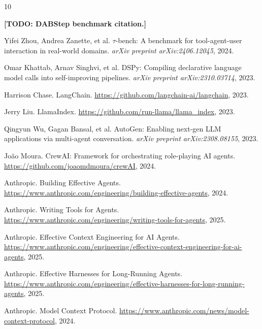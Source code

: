 \documentclass[11pt, logo, onecolumn, copyright, colorlinks=true, allcolors=blue]{nvidiatechreport}
\newcommand{\placeholder}[1]{\textcolor{red!60!black}{\textbf{[TODO: #1]}}}
\begin{document}
\begin{thebibliography}{10}

\placeholder{DABStep benchmark citation.}

Yifei Zhou, Andrea Zanette, et al.
\newblock $\tau$-bench: A benchmark for tool-agent-user interaction in real-world domains.
\newblock \emph{arXiv preprint arXiv:2406.12045}, 2024.

Omar Khattab, Arnav Singhvi, et al.
\newblock DSPy: Compiling declarative language model calls into self-improving pipelines.
\newblock \emph{arXiv preprint arXiv:2310.03714}, 2023.

Harrison Chase.
\newblock LangChain.
\newblock \url{https://github.com/langchain-ai/langchain}, 2023.

Jerry Liu.
\newblock LlamaIndex.
\newblock \url{https://github.com/run-llama/llama_index}, 2023.

Qingyun Wu, Gagan Bansal, et al.
\newblock AutoGen: Enabling next-gen LLM applications via multi-agent conversation.
\newblock \emph{arXiv preprint arXiv:2308.08155}, 2023.

Jo\~{a}o Moura.
\newblock CrewAI: Framework for orchestrating role-playing AI agents.
\newblock \url{https://github.com/joaomdmoura/crewAI}, 2024.

Anthropic.
\newblock Building Effective Agents.
\newblock \url{https://www.anthropic.com/engineering/building-effective-agents}, 2024.

Anthropic.
\newblock Writing Tools for Agents.
\newblock \url{https://www.anthropic.com/engineering/writing-tools-for-agents}, 2025.

Anthropic.
\newblock Effective Context Engineering for AI Agents.
\newblock \url{https://www.anthropic.com/engineering/effective-context-engineering-for-ai-agents}, 2025.

Anthropic.
\newblock Effective Harnesses for Long-Running Agents.
\newblock \url{https://www.anthropic.com/engineering/effective-harnesses-for-long-running-agents}, 2025.

Anthropic.
\newblock Model Context Protocol.
\newblock \url{https://www.anthropic.com/news/model-context-protocol}, 2024.


\end{thebibliography}
\end{document}

